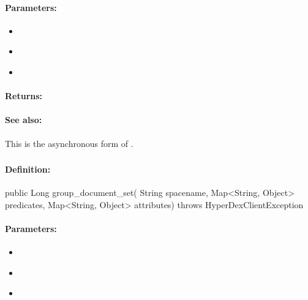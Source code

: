 \paragraph{Parameters:}
\begin{itemize}[noitemsep]
\item {}\\

\item {}\\

\item {}\\

\end{itemize}

\paragraph{Returns:}


\paragraph{See also:}  This is the asynchronous form of .

\pagebreak
\subsubsection{}
\label{api:java:group_document_set}


\paragraph{Definition:}
\begin{javacode}
public Long group_document_set(
        String spacename,
        Map<String, Object> predicates,
        Map<String, Object> attributes) throws HyperDexClientException
\end{javacode}

\paragraph{Parameters:}
\begin{itemize}[noitemsep]
\item {}\\

\item {}\\

\item {}\\

\end{itemize}

